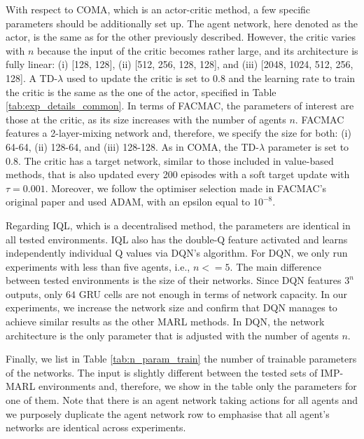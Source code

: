 With respect to COMA, which is an actor-critic method, a few specific parameters should be additionally set up.
The agent network, here denoted as the actor, is the same as for the other previously described.
However, the critic varies with $n$ because the input of the critic becomes rather large, and its architecture is fully linear: (i) [128, 128], (ii) [512, 256, 128, 128], and (iii) [2048, 1024, 512, 256, 128].
A TD-$\lambda$ used to update the critic is set to $0.8$ and the learning rate to train the critic is the same as the one of the actor, specified in Table \ref{tab:exp_details_common}.
In terms of FACMAC, the parameters of interest are those at the critic, as its size increases with the number of agents $n$.
FACMAC features a 2-layer-mixing network and, therefore, we specify the size for both:
(i) 64-64, (ii) 128-64, and (iii) 128-128.
As in COMA, the TD-$\lambda$ parameter is set to $0.8$.
The critic has a target network, similar to those included in value-based methods, that is also updated every 200 episodes with a soft target update with $\tau=0.001$.
Moreover, we follow the optimiser selection made in FACMAC's original paper and used ADAM, with an epsilon equal to $10^{-8}$.

Regarding IQL, which is a decentralised method, the parameters are identical in all tested environments.
IQL also has the double-Q feature activated and learns independently individual Q values via DQN's algorithm.
For DQN, we only run experiments with less than five agents, i.e., $n<=5$.
The main difference between tested environments is the size of their networks. 
Since DQN features $3^n$ outputs, only $64$ GRU cells are not enough in terms of network capacity. 
In our experiments, we increase the network size and confirm that DQN manages to achieve similar results as the other MARL methods.
In DQN, the network architecture is the only parameter that is adjusted with the number of agents $n$.

Finally, we list in Table \ref{tab:n_param_train} the number of trainable parameters of the networks.
The input is slightly different between the tested sets of IMP-MARL environments and, therefore, we show in the table only the parameters for one of them.
Note that there is an agent network taking actions for all agents and we purposely duplicate the agent network row to emphasise that all agent's networks are identical across experiments.

